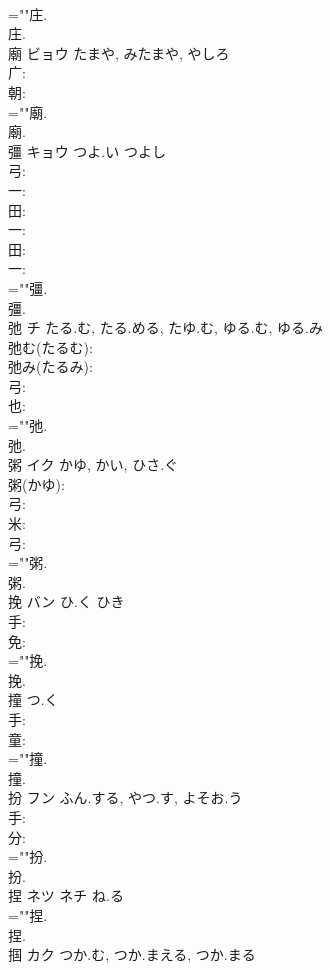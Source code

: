 \documentclass[8pt]{extreport}
\begin{document}
\begin{CJK}{UTF8}{min}
\\	=""庄.
\\	庄.
\\	廟	ビョウ	たまや, みたまや, やしろ		
\\	广: 
\\	朝: 
\\	=""廟.
\\	廟.
\\	彊	キョウ	つよ.い	つよし	
\\	弓: 
\\	一: 
\\	田: 
\\	一: 
\\	田: 
\\	一: 
\\	=""彊.
\\	彊.
\\	弛	チ	たる.む, たる.める, たゆ.む, ゆる.む, ゆる.み		
\\	弛む(たるむ): 
\\	弛み(たるみ): 
\\	弓: 
\\	也: 
\\	=""弛.
\\	弛.
\\	粥	イク	かゆ, かい, ひさ.ぐ		
\\	粥(かゆ): 
\\	弓: 
\\	米: 
\\	弓: 
\\	=""粥.
\\	粥.
\\	挽	バン	ひ.く	ひき	
\\	手: 
\\	免: 
\\	=""挽.
\\	挽.
\\	撞		つ.く				
\\	手: 
\\	童: 
\\	=""撞.
\\	撞.
\\	扮	フン	ふん.する, やつ.す, よそお.う		
\\	手: 
\\	分: 
\\	=""扮.
\\	扮.
\\	捏	ネツ ネチ ね.る			
\\	=""捏.
\\	捏.
\\	掴	カク	つか.む, つか.まえる, つか.まる		

\end{CJK}
\end{document}
